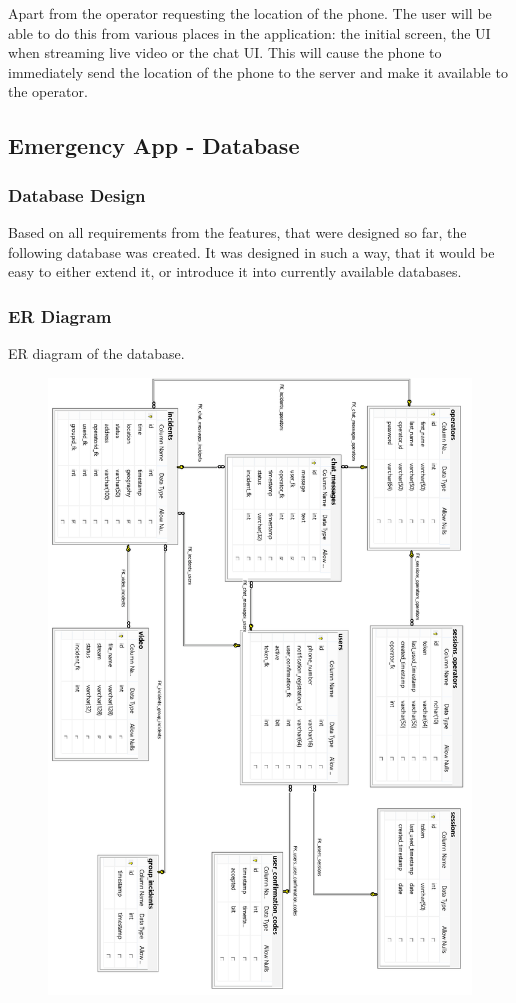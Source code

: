 \documentclass{article}
\begin{document}
Apart from the operator requesting the location of the phone. The user will be able to do this from various places in the application: the initial screen, the UI when streaming live video or the chat UI. This will cause the phone to immediately send the location of the phone to the server and make it available to the operator.


\pagebreak
	\subsection{Emergency App - Database}
		\subsubsection{Database Design}
			Based on all requirements from the features, that were designed so far, the following database was created. It was designed in such a way, that it would be easy to either extend it, or introduce it into currently available databases. 
			\subsubsection{ER Diagram}
			ER diagram of the database.
	\begin{figure}[H]
	\vspace{-10pt}
		\centering
		\includegraphics[width=.8\textwidth]{"Database/file-page1"}
	\vspace{-40pt}
	\end{figure}
			
\end{document}
